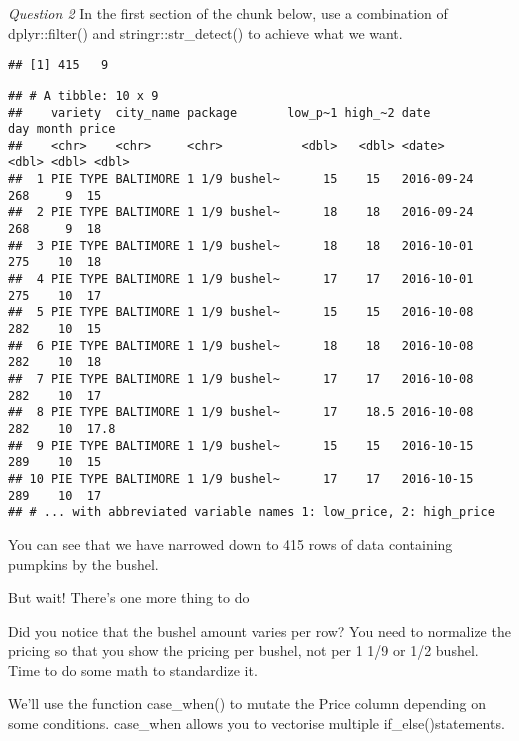 \documentclass[
]{article}
\begin{document}
\emph{Question 2} In the first section of the chunk below, use a
combination of dplyr::filter() and stringr::str\_detect() to achieve
what we want.

\begin{verbatim}
## [1] 415   9
\end{verbatim}

\begin{verbatim}
## # A tibble: 10 x 9
##    variety  city_name package       low_p~1 high_~2 date         day month price
##    <chr>    <chr>     <chr>           <dbl>   <dbl> <date>     <dbl> <dbl> <dbl>
##  1 PIE TYPE BALTIMORE 1 1/9 bushel~      15    15   2016-09-24   268     9  15  
##  2 PIE TYPE BALTIMORE 1 1/9 bushel~      18    18   2016-09-24   268     9  18  
##  3 PIE TYPE BALTIMORE 1 1/9 bushel~      18    18   2016-10-01   275    10  18  
##  4 PIE TYPE BALTIMORE 1 1/9 bushel~      17    17   2016-10-01   275    10  17  
##  5 PIE TYPE BALTIMORE 1 1/9 bushel~      15    15   2016-10-08   282    10  15  
##  6 PIE TYPE BALTIMORE 1 1/9 bushel~      18    18   2016-10-08   282    10  18  
##  7 PIE TYPE BALTIMORE 1 1/9 bushel~      17    17   2016-10-08   282    10  17  
##  8 PIE TYPE BALTIMORE 1 1/9 bushel~      17    18.5 2016-10-08   282    10  17.8
##  9 PIE TYPE BALTIMORE 1 1/9 bushel~      15    15   2016-10-15   289    10  15  
## 10 PIE TYPE BALTIMORE 1 1/9 bushel~      17    17   2016-10-15   289    10  17  
## # ... with abbreviated variable names 1: low_price, 2: high_price
\end{verbatim}

You can see that we have narrowed down to 415 rows of data containing
pumpkins by the bushel.

But wait! There's one more thing to do

Did you notice that the bushel amount varies per row? You need to
normalize the pricing so that you show the pricing per bushel, not per 1
1/9 or 1/2 bushel. Time to do some math to standardize it.

We'll use the function case\_when() to mutate the Price column depending
on some conditions. case\_when allows you to vectorise multiple
if\_else()statements.
\end{document}
